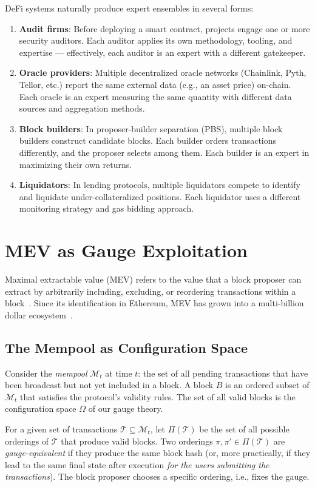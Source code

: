\documentclass[12pt,a4paper]{article}
\theoremstyle{remark}
\newcommand{\T}{\mathcal{T}}
\newcommand{\M}{\mathcal{M}}
\begin{document}
DeFi systems naturally produce expert ensembles in several forms:
\begin{enumerate}
\item \textbf{Audit firms}: Before deploying a smart contract, projects engage
one or more security auditors. Each auditor applies its own methodology,
tooling, and expertise --- effectively, each auditor is an expert with a
different gatekeeper.
\item \textbf{Oracle providers}: Multiple decentralized oracle networks
(Chainlink, Pyth, Tellor, etc.) report the same external data (e.g., an
asset price) on-chain. Each oracle is an expert measuring the same quantity
with different data sources and aggregation methods.
\item \textbf{Block builders}: In proposer-builder separation (PBS), multiple
block builders construct candidate blocks. Each builder orders transactions
differently, and the proposer selects among them. Each builder is an expert
in maximizing their own returns.
\item \textbf{Liquidators}: In lending protocols, multiple liquidators compete
to identify and liquidate under-collateralized positions. Each liquidator
uses a different monitoring strategy and gas bidding approach.
\end{enumerate}

\section{MEV as Gauge Exploitation}
\label{sec:mev}

Maximal extractable value (MEV) refers to the value that a block proposer can
extract by arbitrarily including, excluding, or reordering transactions within
a block~\cite{daian2020flashboys}. Since its identification in Ethereum, MEV
has grown into a multi-billion dollar ecosystem~\cite{qin2022quantifying}.

\subsection{The Mempool as Configuration Space}

Consider the \emph{mempool} $\M_t$ at time $t$: the set of all pending
transactions that have been broadcast but not yet included in a block. A block
$B$ is an ordered subset of $\M_t$ that satisfies the protocol's validity
rules. The set of all valid blocks is the configuration space $\Omega$ of our
gauge theory.

For a given set of transactions $\T \subseteq \M_t$, let $\Pi(\T)$ be the set
of all possible orderings of $\T$ that produce valid blocks. Two orderings
$\pi, \pi' \in \Pi(\T)$ are \emph{gauge-equivalent} if they produce the same
block hash (or, more practically, if they lead to the same final state after
execution \emph{for the users submitting the transactions}). The block proposer
chooses a specific ordering, i.e., fixes the gauge.
\end{document}

